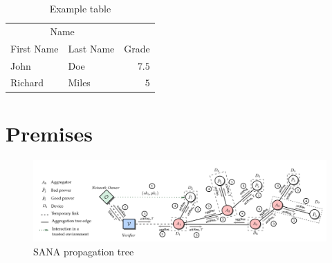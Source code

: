 \documentclass[10pt, a4paper, twocolumn]{article} %
\begin{document}
\begin{table}
	\caption{Example table}
	\centering
	\begin{tabular}{llr}
		\toprule
		\multicolumn{2}{c}{Name} \\
		\cmidrule(r){1-2}
		First Name & Last Name & Grade \\
		\midrule
		John & Doe & $7.5$ \\
		Richard & Miles & $5$ \\
		\bottomrule
	\end{tabular}
\end{table}

 
\section{Premises}

\begin{figure}
	\includegraphics[width=\linewidth]{images/SANA_general.png} %
	\caption{SANA propagation tree} %
	\label{bear} %
\end{figure}
\end{document}
